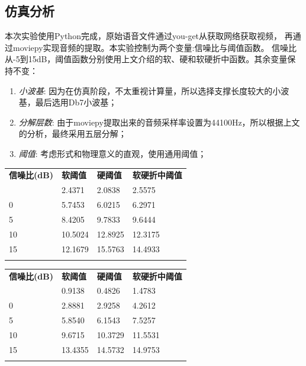 \documentclass{morningstar}
\begin{document}
\subsection{仿真分析}

本次实验使用Python完成，原始语音文件通过you-get从获取网络获取视频，
再通过moviepy实现音频的提取。本实验控制为两个变量:信噪比与阈值函数。
信噪比从-5到15dB，阈值函数分别使用上文介绍的软、硬和软硬折中函数。其余变量保持不变：
\begin{enumerate}
\item \emph{小波基}: 因为在仿真阶段，不太重视计算量，所以选择支撑长度较大的小波基，最后选用Db7小波基；
\item \emph{分解层数}: 由于moviepy提取出来的音频采样率设置为44100Hz，所以根据上文的分析，最终采用五层分解；
\item \emph{阈值}: 考虑形式和物理意义的直观，使用通用阈值；
\end{enumerate}

\begin{table}[htb]
    \centering
    \begin{tabular}{|p{3cm}|p{3cm}|p{3cm}|p{3cm}|}
    \thickhline
    \textbf{信噪比(dB)} & \textbf{软阈值} & \textbf{硬阈值} & \textbf{软硬折中阈值} \\
    \thickhline
    -5               & 2.4371       & 2.0838       & 2.5575          \\
    \hline
    0                & 5.7453       & 6.0215       & 6.2971          \\
    \hline
    5                & 8.4205       & 9.7833       & 9.6444          \\
    \hline
    10               & 10.5024      & 12.8925      & 12.3175         \\
    \hline
    15               & 12.1679      & 15.5763      & 14.4933         \\
    \thickhline
    \end{tabular}
\end{table}

\begin{table}[htb]
    \centering
    \begin{tabular}{|p{3cm}|p{3cm}|p{3cm}|p{3cm}|}
    \thickhline
    \textbf{信噪比(dB)} & \textbf{软阈值} & \textbf{硬阈值} & \textbf{软硬折中阈值} \\
    \thickhline
    -5               & 0.9138       & 0.4826      & 1.4783          \\
    \hline
    0                & 2.8881       & 2.9258       & 4.2612          \\
    \hline
    5                & 5.8540       & 6.1543       & 7.5257          \\
    \hline
    10               & 9.6715      & 10.3729      & 11.5531         \\
    \hline
    15               & 13.4355      & 14.5732      & 14.9753         \\
    \thickhline
    \end{tabular}
\end{table}
\end{document}
